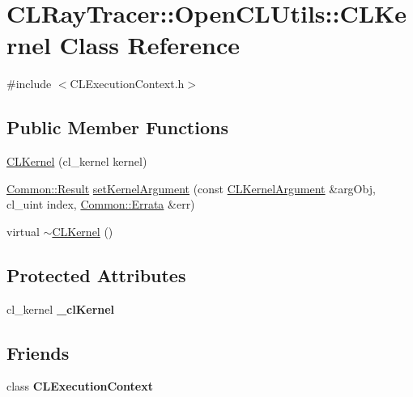 \hypertarget{class_c_l_ray_tracer_1_1_open_c_l_utils_1_1_c_l_kernel}{}\section{C\+L\+Ray\+Tracer\+:\+:Open\+C\+L\+Utils\+:\+:C\+L\+Kernel Class Reference}
\label{class_c_l_ray_tracer_1_1_open_c_l_utils_1_1_c_l_kernel}


{\ttfamily \#include $<$C\+L\+Execution\+Context.\+h$>$}

\subsection*{Public Member Functions}
\begin{DoxyCompactItemize}
\item 
\hyperlink{class_c_l_ray_tracer_1_1_open_c_l_utils_1_1_c_l_kernel_a8c5fdaeb3a112507faf5c9a95b02ef8d}{C\+L\+Kernel} (cl\+\_\+kernel kernel)
\item 
\hyperlink{_errata_8h_a389396702f1aff6e71eb21328b0775c1}{Common\+::\+Result} \hyperlink{class_c_l_ray_tracer_1_1_open_c_l_utils_1_1_c_l_kernel_a126513da641d225be2ba05244305b74d}{set\+Kernel\+Argument} (const \hyperlink{class_c_l_ray_tracer_1_1_open_c_l_utils_1_1_c_l_kernel_argument}{C\+L\+Kernel\+Argument} \&arg\+Obj, cl\+\_\+uint index, \hyperlink{class_c_l_ray_tracer_1_1_common_1_1_errata}{Common\+::\+Errata} \&err)
\item 
virtual \hyperlink{class_c_l_ray_tracer_1_1_open_c_l_utils_1_1_c_l_kernel_ae21951d1144d8d39a88a1f1974c8b49d}{$\sim$\+C\+L\+Kernel} ()
\end{DoxyCompactItemize}
\subsection*{Protected Attributes}
\begin{DoxyCompactItemize}
\item 
cl\+\_\+kernel {\bfseries \+\_\+cl\+Kernel}\hypertarget{class_c_l_ray_tracer_1_1_open_c_l_utils_1_1_c_l_kernel_a7efb48091487bd104b949e18fa8785b1}{}\label{class_c_l_ray_tracer_1_1_open_c_l_utils_1_1_c_l_kernel_a7efb48091487bd104b949e18fa8785b1}

\end{DoxyCompactItemize}
\subsection*{Friends}
\begin{DoxyCompactItemize}
\item 
class {\bfseries C\+L\+Execution\+Context}\hypertarget{class_c_l_ray_tracer_1_1_open_c_l_utils_1_1_c_l_kernel_a778f7cdb701cc5559fd9c919558d70e7}{}\label{class_c_l_ray_tracer_1_1_open_c_l_utils_1_1_c_l_kernel_a778f7cdb701cc5559fd9c919558d70e7}

\end{DoxyCompactItemize}


